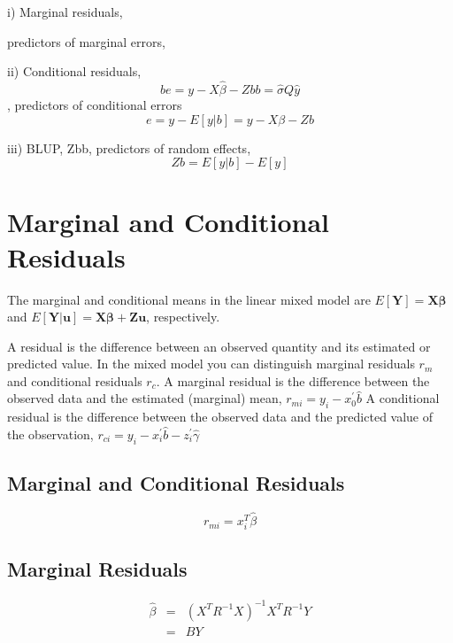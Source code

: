 \documentclass[Main.tex]{subfiles}
\begin{document}
i) Marginal residuals, 

predictors of marginal errors, 


ii) Conditional residuals, 
\[be = y − X\hat{\beta} − Zbb = \hat{\sigma}Q\hat{y}\] , predictors of
conditional errors 
\[e = y − E[y|b] = y − X\beta − Zb\]

iii) BLUP, Zbb, predictors of random effects,
\[ Zb = E[y|b] − E[y]\]


\section{Marginal and Conditional Residuals} %
The marginal and conditional means in the linear mixed model are
$E[\boldsymbol{Y}] = \boldsymbol{X}\boldsymbol{\beta}$ and
$E[\boldsymbol{Y|\boldsymbol{u}}] = \boldsymbol{X}\boldsymbol{\beta} + \boldsymbol{Z}\boldsymbol{u}$, respectively.

A residual is the difference between an observed quantity and its estimated or predicted value. In the mixed
model you can distinguish marginal residuals $r_m$ and conditional residuals $r_c$. A marginal residual is the
difference between the observed data and the estimated (marginal) mean, $r_{mi} = y_i - x_0^{\prime} \hat{b}$
A conditional residual is the difference between the observed data and the predicted value of the observation,
$r_{ci} = y_i - x_i^{\prime} \hat{b} - z_i^{\prime} \hat{\gamma}$

\subsection{Marginal and Conditional Residuals}

\begin{equation}
r_{mi}=x^{T}_{i}\hat{\beta}
\end{equation}

\subsection{Marginal Residuals}
\begin{eqnarray}
\hat{\beta} &=& (X^{T}R^{-1}X)^{-1}X^{T}R^{-1}Y \nonumber \\
&=& BY \nonumber
\end{eqnarray}
\end{document}
